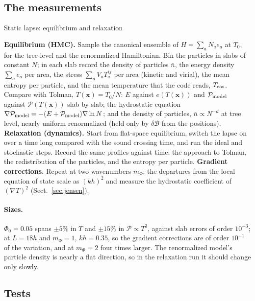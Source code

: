 \documentclass[11pt,aps,preprint,nofootinbib,superscriptaddress,tightenlines]{revtex4-2}
\newcommand{\klab}{\mathcal B}
\def\pr{{\mathcal P}}
\def\Sect#1{Sect.~\ref{#1}}
\let\oldparagraph\paragraph
\renewcommand{\paragraph}{\par\bigskip\oldparagraph}
\begin{document}
\subsection{The measurements}
\label{sec:impl_meas}

\begin{algobox}{Static lapse: equilibrium and relaxation}
\begin{algorithmic}[1]
\State \textbf{Equilibrium (HMC).}  Sample the canonical ensemble of $H=\sum_aN_ae_a$ at $T_0$, for the tree-level and the renormalized Hamiltonian.
\State Bin the particles in slabs of constant $N$; in each slab record the density of particles $\bar n$, the energy density $\sum_ae_a$ per area, the stress
  $\sum_aV_aT_a^{ij}$ per area (kinetic and virial), the mean entropy per particle, and the mean temperature that the code reads, $T_{\rm eos}$.
\State Compare with Tolman, $T(\bm x)=T_0/N$: $E$ against $e(T(\bm x))$ and $\pr_{\rm model}$ against $\pr(T(\bm x))$ slab by slab; the hydrostatic equation
  $\nabla\pr_{\rm model}=-(E+\pr_{\rm model})\nabla\ln N$; and the density of particles, $\bar n\propto N^{-d}$ at tree level, nearly uniform renormalized (held only by
  $\delta\klab$ from the positions).
\State \textbf{Relaxation (dynamics).}  Start from flat-space equilibrium, switch the lapse on over a time long compared with the sound crossing time, and run the ideal and
  stochastic steps.  Record the same profiles against time: the approach to Tolman, the redistribution of the particles, and the entropy per particle.
\State \textbf{Gradient corrections.}  Repeat at two wavenumbers $m_\Phi$; the departures from the local equation of state scale as $(kh)^2$ and measure the hydrostatic
  coefficient of $(\nabla T)^2$ (\Sect{sec:jensen}).
\end{algorithmic}
\end{algobox}

\paragraph{Sizes.}  $\Phi_0=0.05$ spans $\pm5\%$ in $T$ and $\pm15\%$ in $\pr\propto T^3$, against slab errors of order $10^{-3}$; at $L=18h$ and $m_\Phi=1$, $kh=0.35$, so the
gradient corrections are of order $10^{-1}$ of the variation, and at $m_\Phi=2$ four times larger.  The renormalized model's particle density is nearly a flat direction,
so in the relaxation run it should change only slowly.

\subsection{Tests}
\label{sec:impl_tests}
\end{document}
